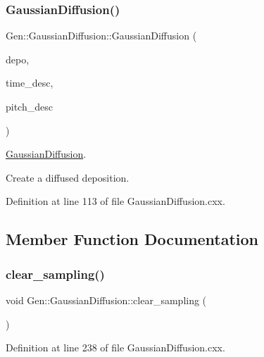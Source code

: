 \subsubsection{\texorpdfstring{Gaussian\+Diffusion()}{GaussianDiffusion()}}
{\footnotesize\ttfamily Gen\+::\+Gaussian\+Diffusion\+::\+Gaussian\+Diffusion (\begin{DoxyParamCaption}\item[{const \hyperlink{class_wire_cell_1_1_i_data_aff870b3ae8333cf9265941eef62498bc}{I\+Depo\+::pointer} \&}]{depo,  }\item[{const \hyperlink{struct_wire_cell_1_1_gen_1_1_gaus_desc}{Gaus\+Desc} \&}]{time\+\_\+desc,  }\item[{const \hyperlink{struct_wire_cell_1_1_gen_1_1_gaus_desc}{Gaus\+Desc} \&}]{pitch\+\_\+desc }\end{DoxyParamCaption})}



\hyperlink{class_wire_cell_1_1_gen_1_1_gaussian_diffusion}{Gaussian\+Diffusion}. 

Create a diffused deposition. 

Definition at line 113 of file Gaussian\+Diffusion.\+cxx.



\subsection{Member Function Documentation}
\mbox{\label{class_wire_cell_1_1_gen_1_1_gaussian_diffusion_ad943ff4bdd0f751f983b375b725e4d45}} 
\subsubsection{\texorpdfstring{clear\+\_\+sampling()}{clear\_sampling()}}
{\footnotesize\ttfamily void Gen\+::\+Gaussian\+Diffusion\+::clear\+\_\+sampling (\begin{DoxyParamCaption}{ }\end{DoxyParamCaption})}



Definition at line 238 of file Gaussian\+Diffusion.\+cxx.

